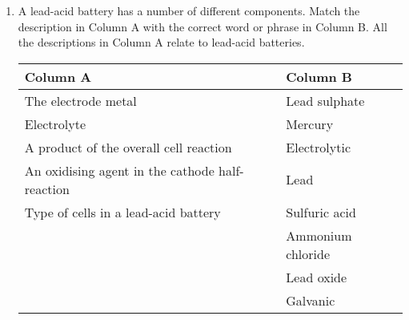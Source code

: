 {\begin{enumerate}
{\begin{enumerate}
\item{Name the process at (1).}
\item{Name the gas at (2).}
\item{Name the process at (3) that produces gas (2).}
\item{Name the product at (4).}
\item{Name two fertilisers that can be produced from nitric acid.}
\end{enumerate}
}

\item{
A lead-acid battery has a number of different components. Match the description in Column A with the correct word or phrase in Column B. All the descriptions in Column A relate to lead-acid batteries.

\begin{center}
\begin{tabular}{ll}
\textbf{Column A} & \textbf{Column B} \\ \hline
The electrode metal \ \ \ \ \ \ \ & Lead sulphate \\
Electrolyte & Mercury \\
A product of the overall cell reaction & Electrolytic \\
An oxidising agent in the cathode half-reaction & Lead \\
Type of cells in a lead-acid battery & Sulfuric acid \\
 & Ammonium chloride \\
 & Lead oxide \\
 & Galvanic \\
\end{tabular}

\end{center}

}
\end{enumerate}
}

